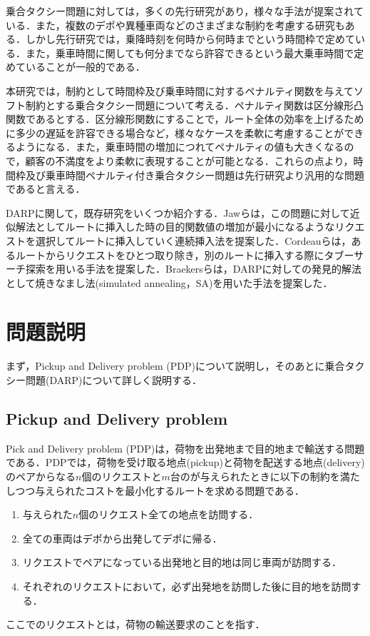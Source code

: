 \documentclass[a4j，11pt，twocolumn]{jsarticle}
\begin{document}
乗合タクシー問題に対しては，多くの先行研究があり，様々な手法が提案されている．また，複数のデポや異種車両などのさまざまな制約を考慮する研究もある．しかし先行研究では，乗降時刻を何時から何時までという時間枠で定めている．また，乗車時間に関しても何分までなら許容できるという最大乗車時間で定めていることが一般的である．

本研究では，制約として時間枠及び乗車時間に対するペナルティ関数を与えてソフト制約とする乗合タクシー問題について考える．ペナルティ関数は区分線形凸関数であるとする．区分線形関数にすることで，ルート全体の効率を上げるために多少の遅延を許容できる場合など，様々なケースを柔軟に考慮することができるようになる．また，乗車時間の増加につれてペナルティの値も大きくなるので，顧客の不満度をより柔軟に表現することが可能となる．これらの点より，時間枠及び乗車時間ペナルティ付き乗合タクシー問題は先行研究より汎用的な問題であると言える．

DARPに関して，既存研究をいくつか紹介する．Jawらは，この問題に対して近似解法としてルートに挿入した時の目的関数値の増加が最小になるようなリクエストを選択してルートに挿入していく連続挿入法を提案した\cite{insertion}．Cordeauらは，あるルートからリクエストをひとつ取り除き，別のルートに挿入する際にタブーサーチ探索を用いる手法を提案した\cite{tabu}．Braekersらは，DARPに対しての発見的解法として焼きなまし法(simulated annealing，SA)を用いた手法を提案した\cite{SA}．


\section{問題説明}
まず，Pickup and Delivery problem (PDP)について説明し，そのあとに乗合タクシー問題(DARP)について詳しく説明する．
\subsection{{\large Pickup and Delivery problem}}
Pick and Delivery problem (PDP)は，荷物を出発地まで目的地まで輸送する問題である．PDPでは，荷物を受け取る地点(pickup)と荷物を配送する地点(delivery)のペアからなる$n$個のリクエストと$m$台のが与えられたときに以下の制約を満たしつつ与えられたコストを最小化するルートを求める問題である．
\begin{enumerate}
 \item 与えられた$n$個のリクエスト全ての地点を訪問する．
 \item 全ての車両はデポから出発してデポに帰る．
 \item リクエストでペアになっている出発地と目的地は同じ車両が訪問する．
 \item それぞれのリクエストにおいて，必ず出発地を訪問した後に目的地を訪問する．
\end{enumerate}
ここでのリクエストとは，荷物の輸送要求のことを指す．
\end{document}
